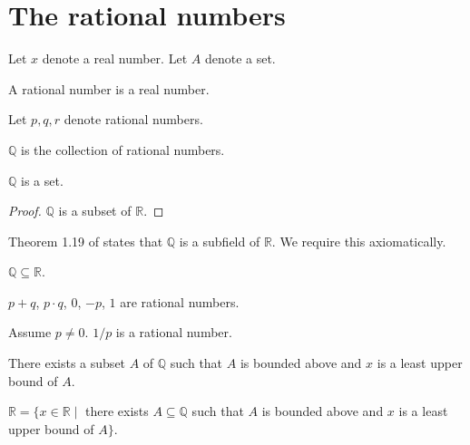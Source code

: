 \documentclass{article}
\begin{document}
\section{The rational numbers}

\begin{forthel}
Let $x$ denote a real number.
Let $A$ denote a set.

\begin{signature}[title=1 19a]
A rational number is a real number.
\end{signature}

Let $p,q,r$ denote rational numbers.

\begin{definition}
$\mathbb{Q}$ is the collection of rational numbers.
\end{definition}

\begin{theorem}
$\mathbb{Q}$ is a set.
\end{theorem}
\begin{proof}
$\mathbb{Q}$ is a subset of $\mathbb{R}$.
\end{proof}

\end{forthel}


Theorem 1.19 of \cite{Rudin1953} states that $\mathbb{Q}$ is a
subfield of $\mathbb{R}$. We require this axiomatically.


\begin{forthel}

\begin{lemma}
$\mathbb{Q} \subseteq \mathbb{R}$.
\end{lemma}

\begin{axiom}
$p + q$, $p \cdot q$, $0$, $-p$, $1$ are rational numbers.
\end{axiom}

\begin{axiom}
Assume $p \neq 0$.
$1/p$ is a rational number.
\end{axiom}

\begin{axiom}
There exists a subset $A$ of $\mathbb{Q}$
such that $A$ is bounded above and
$x$ is a least upper bound of $A$.
\end{axiom}

\begin{theorem}
$\mathbb{R} = \{x \in \mathbb{R} \mid$ there exists $
A \subseteq \mathbb{Q}$ such that $
A$ is bounded above and $x$ is a least upper
bound of $A\}$.
\end{theorem}

\end{forthel}
\end{document}
